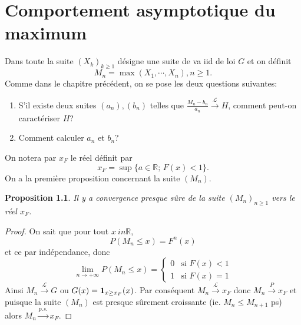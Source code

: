 \documentclass[10p,a4paper,reqno,titlepage]{report}
\newcommand{\R}{\mathbb{R}}
\newcommand{\indic}{\mathrm{{\bf 1}}}
\theoremstyle{plain}
\newtheorem{prop}[prop]{Proposition}
\theoremstyle{definition}
\newcommand{\cvps}{\stackrel{p.s.}{\longrightarrow}}
\newcommand{\cvP}{\stackrel{P}{\longrightarrow}}
\newcommand{\cvloi}{\stackrel{\mathcal{L}}{\longrightarrow}}
\begin{document}
\chapter{Comportement asymptotique du maximum}
Dans toute la suite $(X_k)_{k \geq 1}$ désigne une suite de va iid de loi $G$ et on définit
$$ M_n = \max(X_1,\cdots,X_n), n\geq 1.$$
Comme dans le chapitre précédent, on se pose les deux questions suivantes:\
\begin{enumerate}
	\item S'il existe deux suites $(a_n),(b_n) $ telles que $ \frac{M_n - b_n}{a_n}\cvloi H$, comment peut-on caractériser $H$?
	\item Comment calculer $a_n$ et $b_n$?
\end{enumerate}
On notera par $x_F$ le réel définit par 
$$ x_F = \sup\{a \in \R;\,F(x)<1\}.$$
On a la première proposition concernant la suite $(M_n)$. 
\begin{prop}
	Il y a convergence presque sûre de la suite $(M_n)_{n\geq 1}$ vers le réel $x_F$.
\end{prop}
\begin{proof}
	On sait que pour tout $x \ in\R$,
	$$ P(M_n \leq x) = F^n (x)$$
	et ce par indépendance, donc 
	$$ \lim_{n \to + \infty} P(M_n \leq x )= \left\{ \begin{array}{ll} 0 & \text{si } F(x)<1\\1 & \text{si }F(x) =1
	\end{array}\right.$$
Ainsi $M_n \cvloi G$ ou $G(x)= \indic_{x\geq x_F} (x)$. Par conséquent $M_n \cvloi x_F$ donc $M_n \cvP x_F$ et puisque la suite $(M_n)$ est presque sûrement croissante (ie. $M_n \leq M_{n+1}$ ps) alors $M_n \cvps x_F.$
\end{proof}
\end{document}
